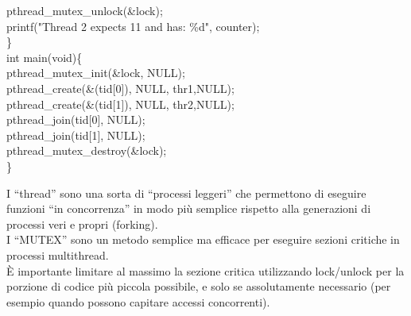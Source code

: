 \begin{flushleft}
\begin{flushleft}
{    \halftab pthread\_mutex\_unlock(\&lock);\\
    \halftab printf("Thread 2 expects 11 and has: \%d\n", counter);\\
    \} \\
    int main(void)\{\\
    \halftab pthread\_mutex\_init(\&lock, NULL);\\
    \halftab pthread\_create(\&(tid[0]), NULL, thr1,NULL);\\
    \halftab pthread\_create(\&(tid[1]), NULL, thr2,NULL);\\
    \halftab pthread\_join(tid[0], NULL);\\
    \halftab pthread\_join(tid[1], NULL);\\
    \halftab pthread\_mutex\_destroy(\&lock);\\
    \} }
  \end{flushleft}
\end{flushleft}
\begin{flushleft}
  I “thread” sono una sorta di “processi leggeri” che permettono di eseguire funzioni 
  “in concorrenza” in modo più semplice rispetto alla generazioni di processi veri e 
  propri (forking).\\
  I “MUTEX” sono un metodo semplice ma efficace per eseguire sezioni critiche in 
  processi multithread.\\
  È importante limitare al massimo la sezione critica utilizzando lock/unlock per la 
  porzione di codice più piccola possibile, e solo se assolutamente necessario (per 
  esempio quando possono capitare accessi concorrenti).
\end{flushleft}

